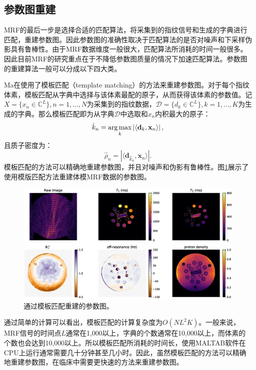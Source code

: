 \subsection{参数图重建}
MRF的最后一步是选择合适的匹配算法，将采集到的指纹信号和生成的字典进行匹配，重建参数图。因此参数图的准确性取决于匹配算法的是否对噪声和下采样伪影具有鲁棒性。由于MRF数据维度一般很大，匹配算法所消耗的时间一般很多。因此目前MRF的研究重点在于不降低参数图质量的情况下加速匹配算法。参数图的重建算法一般可以分成以下四大类。

Ma在\cite{mrf}使用了模板匹配（template matching）的方法来重建参数图。对于每个指纹体素，模板匹配从字典中选择与该体素最配的原子，从而获得该体素的参数值。记$X=\{x_n\in \mathbb{C}^L\}, n=1,...,N$为采集到的指纹数据，$\mathcal{D}=\{d_k\in \mathbb{C}^L\},k=1,...,K$为生成的字典。那么模板匹配即为从字典$\mathcal{D}$中选取和$x_n$内积最大的原子：
\begin{equation}
\hat{k}_n = \operatorname*{arg\,max}_k \left|\left\langle \mathbf{d}_k,\mathbf{x}_n \right\rangle \right|,
\end{equation}
且质子密度为：
\begin{equation}
\hat{\rho}_n=\left|\langle \mathbf{d}_{\hat{k}_n},\mathbf{x}_n \rangle\right|.
\end{equation}
模板匹配的方法可以精确地重建参数图，并且对噪声和伪影有鲁棒性。图\ref{fig:mrfmap}展示了使用模版匹配方法重建体模MRF数据的参数图。
\begin{figure}[htbp]
\centering
\includegraphics[width=1\textwidth]{img/intro/mrfmap.eps}
\caption{通过模板匹配重建的参数图。}
\label{fig:mrfmap}
\end{figure}
通过简单的计算可以看出，模板匹配的计算复杂度为$O(NL^2K)$。一般来说，MRF信号的时间点$L$通常在1,000以上，字典的个数通常在10,000以上，而体素的个数也会达到10,000以上。所以模板匹配所消耗的时间长，使用MALTAB软件在CPU上运行通常需要几十分钟甚至几小时。因此，虽然模板匹配的方法可以精确地重建参数图，在临床中需要更快速的方法来重建参数图。

